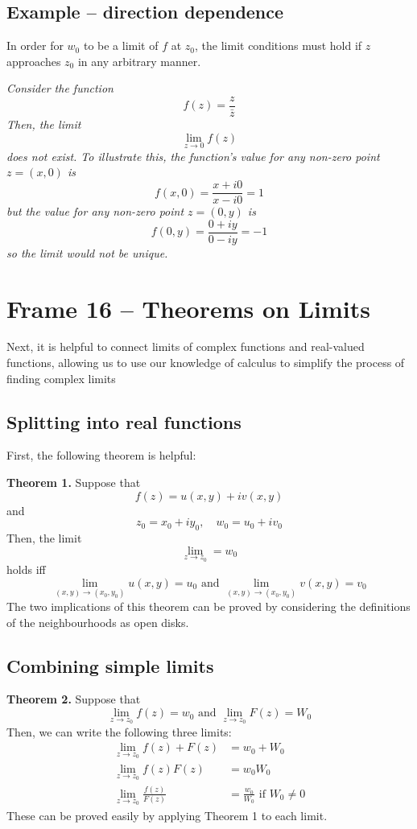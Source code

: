 \documentclass{article}
\begin{document}
\subsection{Example -- direction dependence}
In order for $w_0$ to be a limit of $f$ at $z_0$, the limit conditions must hold if $z$ approaches $z_0$ in any arbitrary manner. 

\textit{Consider the function
\[
	f(z) = \frac{z}{\bar{z}}
\] 
Then, the limit
\[
	\lim_{z \to 0} f(z)
\]
does not exist. To illustrate this, the function's value for any non-zero point $z = (x, 0)$ is
\[
	f(x, 0) = \frac{x + i0}{x - i0} = 1
\]
but the value for any non-zero point $z = (0, y)$ is
\[
	f(0, y) = \frac{0 + iy}{0 - iy} = -1
\]
so the limit would not be unique.
}


\clearpage
\section{Frame 16 -- Theorems on Limits}
Next, it is helpful to connect limits of complex functions and real-valued functions, allowing us to use our knowledge of calculus to simplify the process of finding complex limits

\subsection{Splitting into real functions}
First, the following theorem is helpful:

\textbf{Theorem 1.} Suppose that
\[
	f(z) = u(x, y) + iv(x, y)
\]
and
\[
	z_0 = x_0 + iy_0, \quad	w_0 = u_0 + iv_0
\]
Then, the limit
\[
	\lim_{z \to z_0} = w_0
\]
holds iff
\[
	\lim_{(x,y) \to (x_0, y_0)} u(x, y) = u_0 \text{ and } 
	\lim_{(x,y) \to (x_0, y_0)} v(x, y) = v_0
\]
The two implications of this theorem can be proved by considering the definitions of the neighbourhoods as open disks.

\subsection{Combining simple limits}
\textbf{Theorem 2.} Suppose that
\[
	\lim_{z \to z_0} f(z) = w_0 \text{ and } \lim_{z \to z_0} F(z) = W_0
\]
Then, we can write the following three limits:
\begin{align*}
	\lim_{z \to z_0} f(z) + F(z) &= w_0 + W_0 \\
	\lim_{z \to z_0} f(z) F(z) &= w_0 W_0 \\
	\lim_{z \to z_0} \frac{f(z)}{F(z)} &= \frac{w_0}{W_0} \text{ if } W_0 \neq 0
\end{align*}
These can be proved easily by applying Theorem 1 to each limit.
\end{document}
